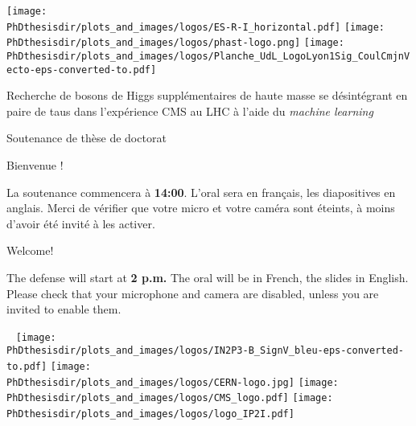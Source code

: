 \documentclass[10pt,aspectratio=169]{beamer}
\begin{document}
\begin{frame}[noframenumbering] \thispagestyle{empty}
\vspace{-.83cm}

\texttt{[image: \\PhDthesisdir/plots\_and\_images/logos/ES-R-I\_horizontal.pdf]}
\hfill
\texttt{[image: \\PhDthesisdir/plots\_and\_images/logos/phast-logo.png]}
\hfill
\texttt{[image: \\PhDthesisdir/plots\_and\_images/logos/Planche\_UdL\_LogoLyon1Sig\_CoulCmjnVecto-eps-converted-to.pdf]}

\vfill

\begin{center}
\color{CERNblue}

{\large Recherche de bosons de Higgs supplémentaires de haute masse se désintégrant en paire de taus dans l'expérience CMS au LHC à l'aide du \emph{machine learning}}

Soutenance de thèse de doctorat
\end{center}

\vfill

\begin{minipage}[c]{.49\textwidth}
{\large\color{CERNblue}Bienvenue !}

\manip La soutenance commencera à \textbf{14:00}.
\manip L'oral sera en français, les diapositives en anglais.
\manip Merci de vérifier que votre micro et votre caméra sont éteints, à moins d'avoir été invité à les activer.
\end{minipage}
\hfill
\begin{minipage}[c]{.49\textwidth}
{\large\color{CERNblue}Welcome!}

\manip The defense will start at \textbf{2 p.m.}
\manip The oral will be in French, the slides in English.
\manip Please check that your microphone and camera are disabled, unless you are invited to enable them.
\end{minipage}

\vfill

~ \hfill
\texttt{[image: \\PhDthesisdir/plots\_and\_images/logos/IN2P3-B\_SignV\_bleu-eps-converted-to.pdf]}
\hfill
\texttt{[image: \\PhDthesisdir/plots\_and\_images/logos/CERN-logo.jpg]}
\hfill
\texttt{[image: \\PhDthesisdir/plots\_and\_images/logos/CMS\_logo.pdf]}
\hfill
\texttt{[image: \\PhDthesisdir/plots\_and\_images/logos/logo\_IP2I.pdf]}
\hfill ~

\vspace{-.5cm}
\end{frame}
\end{document}
